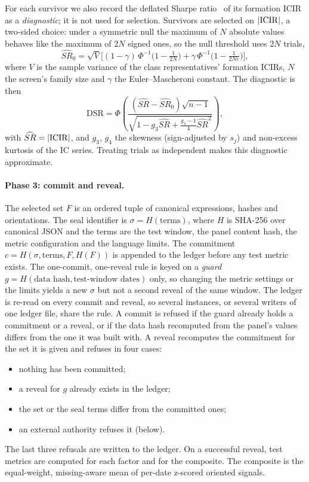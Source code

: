 For each survivor we also record the deflated Sharpe
ratio~\citep{bailey2014deflated} of its formation ICIR as a
\emph{diagnostic}; it is not used for selection. Survivors are selected on
$|\mathrm{ICIR}|$, a two-sided choice: under a symmetric null the maximum of $N$
absolute values behaves like the maximum of $2N$ signed ones, so the null
threshold uses $2N$ trials,
\[
\widehat{SR}_0=\sqrt{V}\Big[(1-\gamma)\,\Phi^{-1}\!\big(1-\tfrac1{2N}\big)+\gamma\,\Phi^{-1}\!\big(1-\tfrac{1}{2Ne}\big)\Big],
\]
where $V$ is the sample variance of the class representatives' formation
ICIRs, $N$ the screen's family size and $\gamma$ the Euler--Mascheroni
constant. The diagnostic is then
\[
\mathrm{DSR}=\Phi\!\left(\frac{(\widehat{SR}-\widehat{SR}_0)\sqrt{n-1}}{\sqrt{1-g_3\widehat{SR}+\tfrac{g_4-1}{4}\widehat{SR}^2}}\right),
\]
with $\widehat{SR}=|\mathrm{ICIR}|$, and $g_3$, $g_4$ the skewness (sign-adjusted by
$s_j$) and non-excess kurtosis of the IC series. Treating trials as
independent makes this diagnostic approximate.

\paragraph{Phase 3: commit and reveal.} The selected set $F$ is an ordered
tuple of canonical expressions, hashes and orientations. The seal
identifier is $\sigma=H(\text{terms})$, where $H$ is SHA-256 over canonical
JSON and the terms are the test window, the panel content hash, the metric
configuration and the language limits. The commitment
$c=H(\sigma,\text{terms},F,H(F))$ is appended to the ledger before any test
metric exists. The one-commit, one-reveal rule is keyed on a \emph{guard}
$g=H(\text{data hash},\text{test-window dates})$ only, so changing the metric
settings or the limits yields a new $\sigma$ but not a second reveal of the
same window. The ledger is re-read on every commit and reveal, so several
instances, or several writers of one ledger file, share the rule. A commit is
refused if the guard already holds a commitment or a reveal, or if the data
hash recomputed from the panel's values differs from the one it was built
with. A reveal recomputes the commitment for the set it is given and refuses
in four cases:
\begin{itemize}
  \item nothing has been committed;
  \item a reveal for $g$ already exists in the ledger;
  \item the set or the seal terms differ from the committed ones;
  \item an external authority refuses it (below).
\end{itemize}
The last three refusals are written to the ledger. On a successful reveal,
test metrics are computed for each factor and for the composite. The
composite is the equal-weight, missing-aware mean of per-date z-scored
oriented signals.

